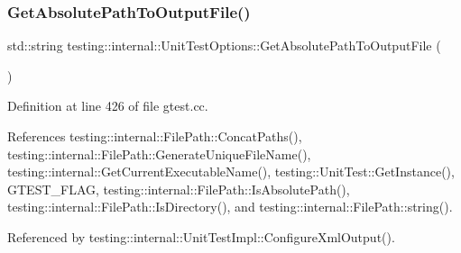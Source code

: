 \mbox{\label{classtesting_1_1internal_1_1UnitTestOptions_a993fb30ad66104158c8c0ac508daca3f}} 
\subsubsection{\texorpdfstring{Get\+Absolute\+Path\+To\+Output\+File()}{GetAbsolutePathToOutputFile()}}
{\footnotesize\ttfamily std\+::string testing\+::internal\+::\+Unit\+Test\+Options\+::\+Get\+Absolute\+Path\+To\+Output\+File (\begin{DoxyParamCaption}{ }\end{DoxyParamCaption})\hspace{0.3cm}{\ttfamily [static]}}



Definition at line 426 of file gtest.\+cc.



References testing\+::internal\+::\+File\+Path\+::\+Concat\+Paths(), testing\+::internal\+::\+File\+Path\+::\+Generate\+Unique\+File\+Name(), testing\+::internal\+::\+Get\+Current\+Executable\+Name(), testing\+::\+Unit\+Test\+::\+Get\+Instance(), G\+T\+E\+S\+T\+\_\+\+F\+L\+AG, testing\+::internal\+::\+File\+Path\+::\+Is\+Absolute\+Path(), testing\+::internal\+::\+File\+Path\+::\+Is\+Directory(), and testing\+::internal\+::\+File\+Path\+::string().



Referenced by testing\+::internal\+::\+Unit\+Test\+Impl\+::\+Configure\+Xml\+Output().


